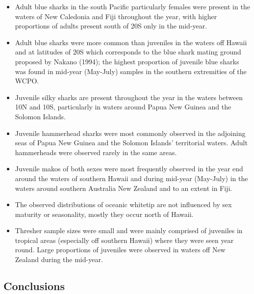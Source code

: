 \documentclass[12pt]{SCreport}
\begin{document}
\begin{itemize}

  \item	Adult blue sharks in the south Pacific particularly females were present in the waters of New Caledonia and Fiji throughout the year, with higher proportions of adults present south of 20\degree{}S only in the mid-year. 
  \item Adult blue sharks were more common than juveniles in the waters off Hawaii and at latitudes of 20\degree{}S which corresponds to the blue shark mating ground proposed by Nakano (1994); the highest proportion of juvenile blue sharks was found in mid-year (May-July) samples in the southern extremities of the WCPO.
  \item Juvenile silky sharks are present throughout the year in the waters between 10\degree{}N and 10\degree{}S, particularly in waters around Papua New Guinea and the Solomon Islands.
  \item	Juvenile hammerhead sharks were most commonly observed in the adjoining seas of Papua New Guinea and the Solomon Islands’ territorial waters. Adult hammerheads were observed rarely in the same areas. 
\item Juvenile makos of both sexes were most frequently observed in the year end around the waters of southern Hawaii and during mid-year (May-July) in the waters around southern Australia New Zealand and to an extent in Fiji. 
\item The observed distributions of oceanic whitetip are not influenced by sex maturity or seasonality,  mostly they occur north of Hawaii.

\item Thresher sample sizes were small and were mainly comprised of juveniles in tropical areas (especially off southern Hawaii) where they were seen year round. Large proportions of juveniles were observed in waters off New Zealand during the mid-year.
\end{itemize}

            
\subsection{Conclusions}
\end{document}
